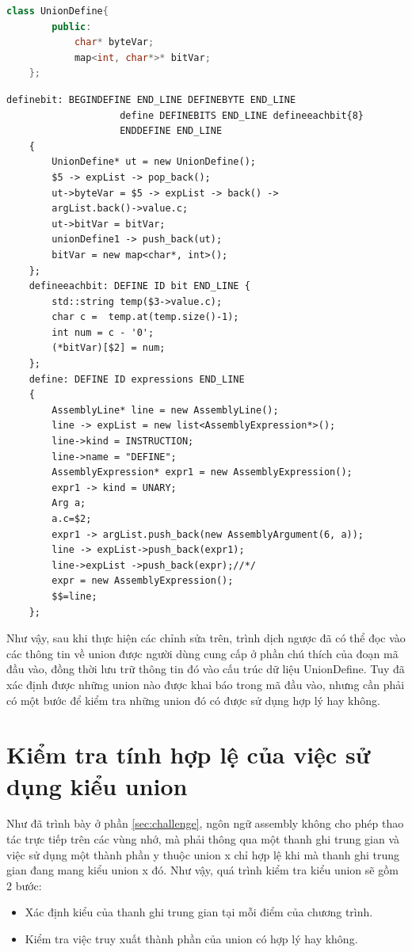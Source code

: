 \begin{changemargin}{0cm}{0cm} 
	\begin{lstlisting}[caption={Cấu trúc dữ liệu để lưu trữ một union},label={list:listuniondefine},language=c++]
	class UnionDefine{
		public:
			char* byteVar;
			map<int, char*>* bitVar;
	};
	\end{lstlisting}
	\begin{lstlisting}[caption={Đoạn mã parser bao gồm các hành động sau khi nhận biết được union},label={list:8051parser2}]
	definebit: BEGINDEFINE END_LINE DEFINEBYTE END_LINE 
					define DEFINEBITS END_LINE defineeachbit{8} 
					ENDDEFINE END_LINE
	{
		UnionDefine* ut = new UnionDefine();
		$5 -> expList -> pop_back();
		ut->byteVar = $5 -> expList -> back() -> 
		argList.back()->value.c;
		ut->bitVar = bitVar;
		unionDefine1 -> push_back(ut);
		bitVar = new map<char*, int>();
	};
	defineeachbit: DEFINE ID bit END_LINE {
		std::string temp($3->value.c);
		char c =  temp.at(temp.size()-1);
		int num = c - '0';
		(*bitVar)[$2] = num;
	};
	define: DEFINE ID expressions END_LINE 
	{ 
		AssemblyLine* line = new AssemblyLine();
		line -> expList = new list<AssemblyExpression*>();
		line->kind = INSTRUCTION;
		line->name = "DEFINE";
		AssemblyExpression* expr1 = new AssemblyExpression();
		expr1 -> kind = UNARY;
		Arg a;
		a.c=$2;
		expr1 -> argList.push_back(new AssemblyArgument(6, a));
		line -> expList->push_back(expr1);
		line->expList ->push_back(expr);//*/
		expr = new AssemblyExpression();
		$$=line;
	};
	\end{lstlisting}
\end{changemargin} 
	
Như vậy, sau khi thực hiện các chỉnh sửa trên, trình dịch ngược đã có thể đọc vào các thông tin về union được người dùng cung cấp ở phần chú thích của đoạn mã đầu vào, đồng thời lưu trữ thông tin đó vào cấu trúc dữ liệu UnionDefine. Tuy đã xác định được những union nào được khai báo trong mã đầu vào, nhưng cần phải có một bước để kiểm tra những union đó có được sử dụng hợp lý hay không.
\section{Kiểm tra tính hợp lệ của việc sử dụng kiểu union}
Như đã trình bày ở phần \ref{sec:challenge}, ngôn ngữ assembly không cho phép thao tác trực tiếp trên các vùng nhớ, mà phải thông qua một thanh ghi trung gian và việc sử dụng một thành phần y thuộc union x chỉ hợp lệ khi mà thanh ghi trung gian đang mang kiểu union x đó. Như vậy, quá trình kiểm tra kiểu union sẽ gồm 2 bước:
\begin{itemize}
	\item Xác định kiểu của thanh ghi trung gian tại mỗi điểm của chương trình.
	\item Kiểm tra việc truy xuất thành phần của union có hợp lý hay không.
\end{itemize}
